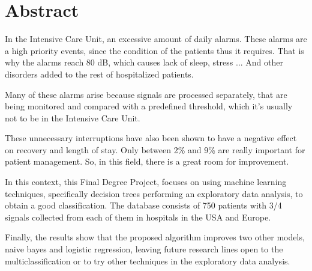 \chapter* {Abstract}

In the Intensive Care Unit, an excessive amount of daily alarms. These alarms are a high priority events, since the condition of the patients thus it requires. That is why the alarms reach 80 dB, which causes lack of sleep, stress ... And other disorders added to the rest of hospitalized patients.\\
\vspace*{0.75cm}

Many of these alarms arise because signals are processed separately, that are being monitored and compared with a predefined threshold, which it's usually not to be in the Intensive Care Unit.\\
\vspace*{0.75cm}

These unnecessary interruptions have also been shown to have a negative effect on recovery and length of stay. Only between 2\% and 9\% are really important for patient management. So, in this field, there is a great room for improvement.
\vspace*{0.75cm}

In this context, this Final Degree Project, focuses on using machine learning techniques, specifically decision trees performing an exploratory data analysis, to obtain a good classification. The database consists of 750 patients with 3/4 signals collected from each of them in hospitals in the USA and Europe.
\vspace*{0.75cm}

Finally, the results show that the proposed algorithm improves two other models, naive bayes and logistic regression, leaving future research lines open
to the multiclassification or to try other techniques in the exploratory data analysis.

